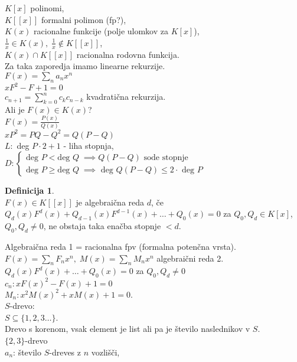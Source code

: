 \documentclass[a4paper, 12pt]{book}
\theoremstyle{definition}
\newtheorem{defn}[counter]{Definicija}
\theoremstyle{remark}
\begin{document}
$K[x]$ polinomi, \\
$K[[x]]$ formalni polimon (fp?), \\
$K(x)$ racionalne funkcije (polje ulomkov za $K[x]$), \\
$\frac{1}{x} \in K(x), \; \frac{1}{x} \notin K[[x]]$, \\
$K(x) \cap K[[x]]$ racionalna rodovna funkcija. \\
Za taka zaporedja imamo linearne rekurzije. \\
$F(x) = \sum_n a_n x^n$ \\
$xF^2 - F + 1 = 0$ \\
$c_{n+1} = \sum_{k=0}^{n} c_k c_{n-k}$ kvadratična rekurzija. \\
Ali je $F(x) \in K(x)$? \\
$F(x) = \frac{P(x)}{Q(x)}$ \\
$xP^2 = PQ - Q^2 = Q(P-Q)$ \\
$L:$ deg $P \cdot 2 + 1$ - liha stopnja, \\
$D: \begin{cases}
  \text{deg } P < \text{deg } Q \; \implies Q(P-Q) \text{ sode stopnje} \\
  \text{deg } P \geq \text{deg } Q \; \implies \text{ deg } Q(P-Q) \leq 2 \cdot \text{ deg } P
\end{cases}$
\begin{defn} \text{} \\
  $F(x) \in K[[x]]$ je algebraična reda $d$, če \\
  $Q_d(x) F^d(x) + Q_{d-1}(x) F^{d-1}(x) + \dots + Q_0(x) = 0$ za $Q_0, Q_d \in K[x]$,
  $Q_0, Q_d \neq 0$, ne obstaja taka enačba stopnje $< d$.
\end{defn}
Algebraična reda 1 = racionalna fpv (formalna potenčna vrsta). \\
$F(x) = \sum_n F_n x^n, \; M(x) = \sum_n M_n x^n$ algebraični reda 2. \\
%
%
%
$Q_d(x) F^d(x) + \dots + Q_0(x) = 0$ za $Q_0, Q_d \neq 0$ \\
$c_n: x F(x)^2 - F(x) + 1 = 0$ \\
$M_n: x^2 M(x)^2 + x M(x) + 1 = 0$. \\
$S$-drevo: \\
$S \subseteq \{1, 2, 3 \dots\}$. \\
Drevo s korenom, vsak element je list ali pa je število naslednikov v $S$. \\
$\{2,3\}$-drevo \\
$a_n$: število $S$-dreves z $n$ vozlišči, \\
\end{document}
